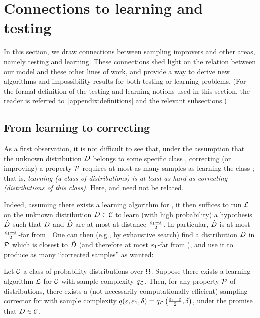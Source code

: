 \section{Connections to learning and testing}\label{sec:connections}
	In this section, we draw connections between sampling improvers and other areas, namely testing and learning. These connections shed light on the relation between our model and these other lines of work, and provide a way to derive new algorithms and impossibility results for both testing or learning problems. (For the formal definition of the testing and learning notions used in this section, the reader is referred to~\autoref{appendix:definitions} and the relevant subsections.)

\subsection{From learning to correcting}\label{ssec:connection:learning:approach}As a first observation, it is not difficult to see that, under the assumption that the unknown distribution $D$ belongs to some specific class \class, correcting (or improving) a property $\mathcal{P}$ requires at most as many samples as learning the class \class; that is, \emph{learning (a class of distributions) is at least as hard as correcting (distributions of this class).} Here, \property and \class need not be related.

Indeed, assuming there exists a learning algorithm \Learner for \class, it then suffices to run $\mathcal{L}$ on the unknown distribution $D\in\mathcal{C}$ to learn (with high probability) a hypothesis $\hat{D}$ such that $D$ and $\hat{D}$ are at most at distance $\frac{\varepsilon_1-\varepsilon}{2}$. In particular, $\hat{D}$ is at most $\frac{\varepsilon_1+\varepsilon}{2}$-far from \property. One can then (e.g., by exhaustive search) find a distribution $\tilde{D}$ in $\mathcal{P}$ which is closest to $\hat{D}$ (and therefore at most $\varepsilon_1$-far from \D), and use it to produce as many ``corrected samples'' as wanted:

\begin{theorem}\label{theo:connection:regular:learning}
Let $\mathcal{C}$ a class of probability distributions over ${\Omega}$. Suppose there exists a learning algorithm $\mathcal{L}$ for $\mathcal{C}$ with sample complexity $q_\mathcal{L}$.
Then, for any property $\mathcal{P}$ of distributions, there exists a (not-necessarily computationally efficient) sampling corrector for \property with sample complexity $q(\varepsilon,\varepsilon_1,\delta)=q_\mathcal{L}\left(\frac{\varepsilon_1-\varepsilon}{2},\delta\right)$, under the promise that $D\in\mathcal{C}$.
\end{theorem}

